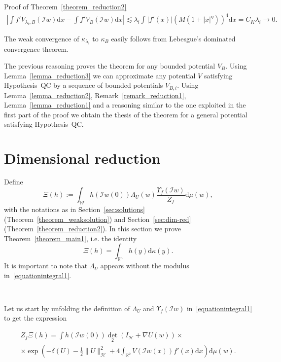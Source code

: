 \documentclass[a4paper,10pt]{article}
\newcommand{\assign}{:=}
\newcommand{\mathd}{\mathrm{d}}
\newenvironment{proof*}[1]{\noindent\textbf{#1\ }}{\hspace*{\fill}$\Box$\medskip}
\begin{document}
\begin{proof*}{Proof of Theorem~\ref{theorem_reduction2}}
  \begin{multline*}
    \left| \int f' V_{\lambda_i, B} (\mathcal{I}w) \mathd x - \int f' V_B
    (\mathcal{I}w) \mathd x \right| \lesssim \lambda_i \int_{\mathfrak{}} | f' (x) | (M (1 + | x |^{\eta}))^4
    \mathd x = C_K \lambda_i \rightarrow 0.
  \end{multline*}
  
  The weak convergence of $\kappa_{\lambda_i}$ to $\kappa_B$ easily follows
  from Lebesgue's dominated convergence theorem.
  
  The previous reasoning proves the theorem for any bounded potential $V_B$.
  Using Lemma~\ref{lemma_reduction3} we can approximate any potential $V$
  satisfying Hypothesis~QC by a sequence of bounded potentials $V_{B, i}$.
  Using Lemma~\ref{lemma_reduction2}, Remark~\ref{remark_reduction1},
  Lemma~\ref{lemma_reduction1} and a reasoning similar to the one exploited in
  the first part of the proof we obtain the thesis of the theorem for a
  general potential satisfying Hypothesis~QC. 
\end{proof*}

\section{Dimensional reduction}\label{sec:super}

Define
\begin{equation}
  \Xi (h) \assign \int_{\mathcal{W}} h (\mathcal{I}w (0)) \Lambda_U (w)
  \frac{\Upsilon_f (\mathcal{I}w)}{Z_f} \mathd \mu (w),
  \label{equationintegral1}
\end{equation}
with the notations as in Section~\ref{sec:solutions}
(Theorem~\ref{theorem_weaksolution}) and Section~\ref{sec:dim-red}
(Theorem~\ref{theorem_reduction2}). In this section we prove
Theorem~\ref{theorem_main1}, i.e. the identity
\begin{equation}
  \Xi (h) = \int_{\mathbb{R}^n} h (y) \mathd \kappa (y) . \label{eq:main}
\end{equation}
It is important to note that $\Lambda_U$ appears without the modulus
in~{\eqref{equationintegral1}}.

\

Let us start by unfolding the definition of $\Lambda_U$ and $\Upsilon_f
(\mathcal{I}w)$ in~{\eqref{equationintegral1}} to get the expression

\begin{multline*}
  Z_f \Xi (h) = \int h (\mathcal{I}w (0)) \det_2 (I_{\mathcal{H}} + \nabla U
  (w)) \times\\
  \times \exp \left( - \delta (U) - \frac{1}{2} \|U\|^2_{\mathcal{H}} + 4 \int_{\mathbb{R}^2}
  V (\mathcal{I}w (x)) f' (x) \mathd x \right) \mathd \mu (w) .
\end{multline*}
\end{document}
